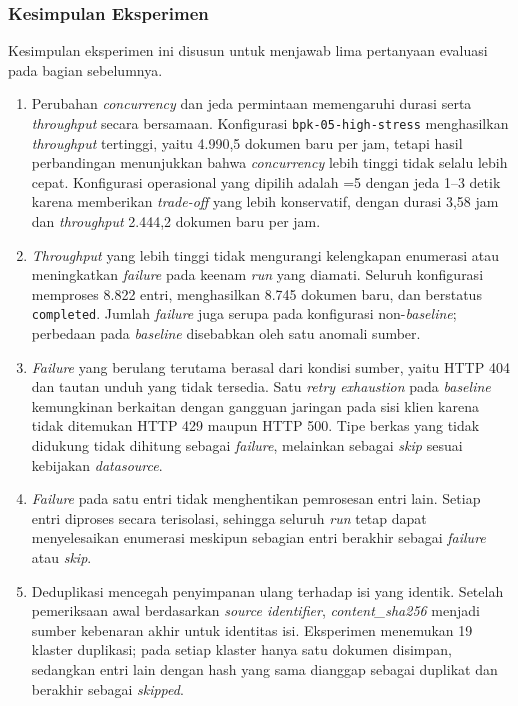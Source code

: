 \subsubsection{Kesimpulan Eksperimen}
\label{sec:kesimpulan-evaluasi-bpk}

Kesimpulan eksperimen ini disusun untuk menjawab lima pertanyaan evaluasi pada bagian sebelumnya.

\begin{enumerate}
  \item Perubahan \textit{concurrency} dan jeda permintaan memengaruhi durasi serta \textit{throughput} secara bersamaan.
  Konfigurasi \mbox{\texttt{bpk-05-high-stress}} menghasilkan \textit{throughput} tertinggi, yaitu 4.990,5 dokumen baru per jam, tetapi hasil perbandingan menunjukkan bahwa \textit{concurrency} lebih tinggi tidak selalu lebih cepat.
  Konfigurasi operasional yang dipilih adalah =5 dengan jeda 1--3 detik karena memberikan \textit{trade-off} yang lebih konservatif, dengan durasi 3,58 jam dan \textit{throughput} 2.444,2 dokumen baru per jam.

  \item \textit{Throughput} yang lebih tinggi tidak mengurangi kelengkapan enumerasi atau meningkatkan \textit{failure} pada keenam \textit{run} yang diamati.
  Seluruh konfigurasi memproses 8.822 entri, menghasilkan 8.745 dokumen baru, dan berstatus \texttt{completed}.
  Jumlah \textit{failure} juga serupa pada konfigurasi non-\textit{baseline}; perbedaan pada \textit{baseline} disebabkan oleh satu anomali sumber.

  \item \textit{Failure} yang berulang terutama berasal dari kondisi sumber, yaitu HTTP 404 dan tautan unduh yang tidak tersedia.
  Satu \textit{retry exhaustion} pada \textit{baseline} kemungkinan berkaitan dengan gangguan jaringan pada sisi klien karena tidak ditemukan HTTP 429 maupun HTTP 500.
  Tipe berkas yang tidak didukung tidak dihitung sebagai \textit{failure}, melainkan sebagai \textit{skip} sesuai kebijakan \textit{datasource}.

  \item \textit{Failure} pada satu entri tidak menghentikan pemrosesan entri lain.
  Setiap entri diproses secara terisolasi, sehingga seluruh \textit{run} tetap dapat menyelesaikan enumerasi meskipun sebagian entri berakhir sebagai \textit{failure} atau \textit{skip}.

  \item Deduplikasi mencegah penyimpanan ulang terhadap isi yang identik.
  Setelah pemeriksaan awal berdasarkan \textit{source identifier}, \textit{content\_sha256} menjadi sumber kebenaran akhir untuk identitas isi.
  Eksperimen menemukan 19 klaster duplikasi; pada setiap klaster hanya satu dokumen disimpan, sedangkan entri lain dengan hash yang sama dianggap sebagai duplikat dan berakhir sebagai \textit{skipped}.
\end{enumerate}

